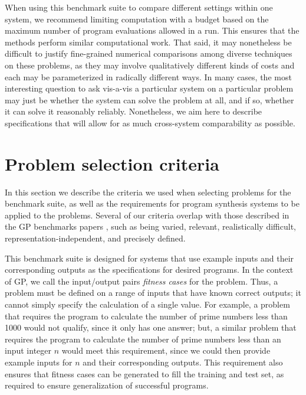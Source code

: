\documentclass{sig-alternate}
\begin{document}




When using this benchmark suite to compare different settings within one system, we recommend limiting computation with a budget based on the maximum number of program evaluations allowed in a run. This ensures that the methods perform similar computational work. That said, it may nonetheless be difficult to justify fine-grained numerical comparisons among diverse techniques on these problems, as they may involve qualitatively different kinds of costs and each may be parameterized in radically different ways. In many cases, the most interesting question to ask vis-a-vis a particular system on a particular problem may just be whether the system can solve the problem at all, and if so,  whether it can solve it reasonably reliably. Nonetheless, we aim here to describe specifications that will allow for as much cross-system comparability as possible. %


\section{Problem selection criteria} \label{requirements}

In this section we describe the criteria we used when selecting problems for the benchmark suite, as well as the requirements for program synthesis systems to be applied to the problems. Several of our criteria overlap with those described in the GP benchmarks papers \cite{McDermott:2012:GECCO, White:2013:BGB:2441218.2441242}, such as being varied, relevant, realistically difficult, representation-independent, and precisely defined. 

This benchmark suite is designed for systems that use example inputs and their corresponding outputs as the specifications for desired programs. In the context of GP, we call the input/output pairs \textit{fitness cases} for the problem. Thus, a problem must be defined on a range of inputs that have known correct outputs; it cannot simply specify the calculation of a single value. For example, a problem that requires the program to calculate the number of prime numbers less than 1000 would not qualify, since it only has one answer; but, a similar problem that requires the program to calculate the number of prime numbers less than an input integer $n$ would meet this requirement, since we could then provide example inputs for $n$ and their corresponding outputs. This requirement also ensures that fitness cases can be generated to fill the training and test set, as required to ensure generalization of successful programs.
\end{document}
